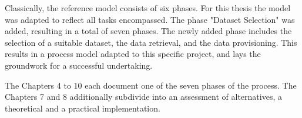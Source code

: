 Classically, the reference model consists of six phases. For this thesis the model was adapted to reflect all tasks encompassed. The phase "Dataset Selection" was added, resulting in a total of seven phases. The newly added phase includes the selection of a suitable dataset, the data retrieval, and the data provisioning. This results in a process model adapted to this specific project, and lays the groundwork for a successful undertaking.

The Chapters 4 to 10 each document one of the seven phases of the process. The Chapters 7 and 8 additionally subdivide into an assessment of alternatives, a theoretical and a practical implementation.

 